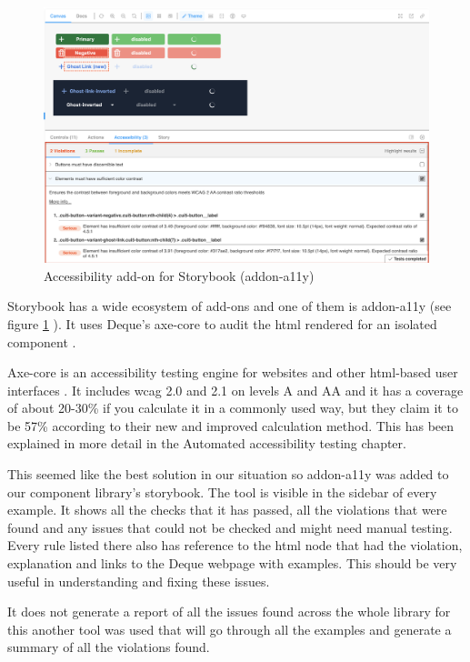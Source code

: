 \documentclass{master_thesis}
\begin{document}
\begin{figure}[H]
	\includegraphics[width=\textwidth]{img/addon-a11y.png}
	\caption{Accessibility add-on for Storybook (addon-a11y)}
	\label{fig:addon-a11y}
\end{figure}

Storybook has a wide ecosystem of add-ons and one of them is addon-a11y (see figure \ref{fig:addon-a11y} ). It uses Deque's axe-core to audit the \ac{html} rendered for an isolated component \citep{addon-a11y}.

Axe-core is an accessibility testing engine for websites and other \ac{html}-based user interfaces \citep{Deque2023}. It includes \ac{wcag} 2.0 and 2.1 on levels A and AA and it has a coverage of about 20-30\% if you calculate it in a commonly used way, but they claim it to be 57\% according to their new and improved calculation method. This has been explained in more detail in the Automated accessibility testing chapter.

This seemed like the best solution in our situation so addon-a11y was added to our component library’s storybook. The tool is visible in the sidebar of every example. It shows all the checks that it has passed, all the violations that were found and any issues that could not be checked and might need manual testing. Every rule listed there also has reference to the \ac{html} node that had the violation, explanation and links to the Deque webpage with examples. This should be very useful in understanding and fixing these issues.

It does not generate a report of all the issues found across the whole library for this another tool was used that will go through all the examples and generate a summary of all the violations found.
\end{document}
